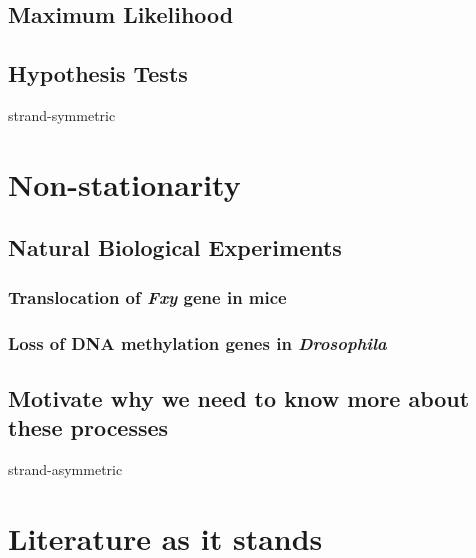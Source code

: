 \subsection{Maximum Likelihood}

\subsection{Hypothesis Tests}

\gls{strand-symmetric}

\section{Non-stationarity}

\subsection{Natural Biological Experiments}

\subsubsection{Translocation of \textit{Fxy} gene in mice}



\subsubsection{Loss of DNA methylation genes in \textit{Drosophila}}

\subsection{Motivate why we need to know more about these processes}

\gls{strand-asymmetric}

\section{Literature as it stands}